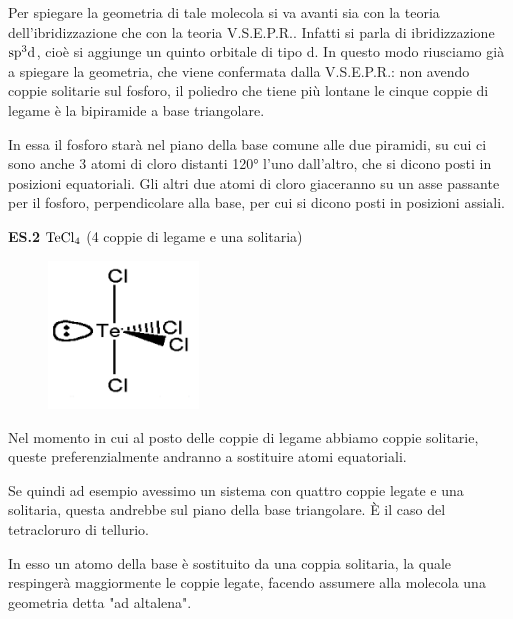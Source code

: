 \vspace{0.2cm}Per spiegare la geometria di tale molecola si va avanti sia con la teoria dell'ibridizzazione che con la teoria V.S.E.P.R.. Infatti si parla di ibridizzazione $\rm sp^3d$, cioè si aggiunge un quinto orbitale di tipo d. In questo modo riusciamo già a spiegare la geometria, che viene confermata dalla V.S.E.P.R.: non avendo coppie solitarie sul fosforo, il poliedro che tiene più lontane le cinque coppie di legame è la bipiramide a base triangolare.   

In essa il fosforo starà nel piano della base comune alle due piramidi, su cui ci sono anche 3 atomi di cloro distanti 120° l'uno dall'altro, che si dicono posti in posizioni equatoriali. Gli altri due atomi di cloro giaceranno su un asse passante per il fosforo, perpendicolare alla base, per cui si dicono posti in posizioni assiali.

\vspace{0.2cm}\textbf{ES.2} $\rm TeCl_4$ (4 coppie di legame e una solitaria)

\hspace{0.5cm}\begin{minipage}{0.2\textwidth}
    \begin{figure}[H]
        \includegraphics[width=4cm]{immagini/TeCl_4.png}
    \end{figure}
\end{minipage} \hfill
\begin{minipage}{0.65\textwidth}
    \vspace{0.2cm}Nel momento in cui al posto delle coppie di legame abbiamo coppie solitarie, queste preferenzialmente andranno a sostituire atomi equatoriali.

    Se quindi ad esempio avessimo un sistema con quattro coppie legate e una solitaria, questa andrebbe sul piano della base triangolare. È il caso del tetracloruro di tellurio.

    In esso un atomo della base è sostituito da una coppia solitaria, la quale respingerà maggiormente le coppie legate, facendo assumere alla molecola una geometria detta "ad altalena".
\end{minipage}

